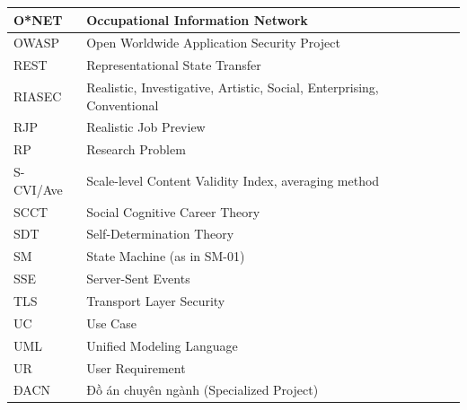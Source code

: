 {\begin{longtable}{|>{\raggedright\arraybackslash}p{}|>{\raggedright\arraybackslash}p{}|}
O*NET & Occupational Information Network \\ \hline
OWASP & Open Worldwide Application Security Project \\ \hline
REST & Representational State Transfer \\ \hline
RIASEC & Realistic, Investigative, Artistic, Social, Enterprising, Conventional \\ \hline
RJP & Realistic Job Preview \\ \hline
RP & Research Problem \\ \hline
S-CVI/Ave & Scale-level Content Validity Index, averaging method \\ \hline
SCCT & Social Cognitive Career Theory \\ \hline
SDT & Self-\allowbreak{}Determination Theory \\ \hline
SM & State Machine (as in SM-01) \\ \hline
SSE & Server-Sent Events \\ \hline
TLS & Transport Layer Security \\ \hline
UC & Use Case \\ \hline
UML & Unified Modeling Language \\ \hline
UR & User Requirement \\ \hline
ĐACN & Đồ án chuyên ngành (Specialized Project) \\ \hline
\end{longtable}
}
